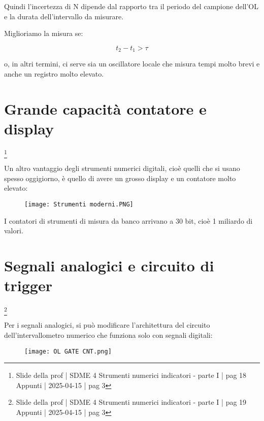 Quindi l'incertezza di N dipende dal rapporto tra il periodo del campione dell'OL 
e la durata dell'intervallo da misurare. \newline 

Miglioriamo la misura se: 

{
    \Large 
    \begin{equation}
        t_2 - t_1 > \tau
    \end{equation}
}

o, in altri termini, ci serve sia un oscillatore locale che misura tempi molto brevi 
e anche un registro molto elevato. \newline 

\newpage 

\section{Grande capacità contatore e display}
\footnote{Slide della prof | SDME 4 Strumenti numerici indicatori - parte I | pag 18 \\  
Appunti | 2025-04-15 | pag 3}

Un altro vantaggio degli strumenti numerici digitali, cioè quelli che si usano spesso oggigiorno, è 
quello di avere un grosso display e un contatore molto elevato: 

\begin{figure}[h]
    \centering
    \texttt{[image: Strumenti moderni.PNG]}
\end{figure}

I contatori di strumenti di misura da banco arrivano a 30 bit, cioè 1 miliardo di valori. \newline 

\newpage 

\section{Segnali analogici e circuito di trigger}
\footnote{Slide della prof | SDME 4 Strumenti numerici indicatori - parte I | pag 19 \\  
Appunti | 2025-04-15 | pag 3 }

Per i segnali analogici, si può modificare l'architettura del circuito dell'intervallometro numerico che funziona solo con segnali digitali: 

\begin{figure}[h]
    \centering
    \texttt{[image: OL GATE CNT.png]}
\end{figure} 

